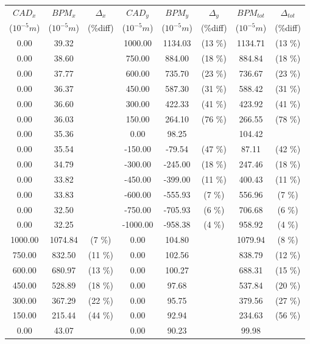 \begin{table}
\centering
\begin{tabular}{c c c c c c c c}
\toprule
\textbf{$CAD_{x}$} & \textbf{$BPM_{x}$ } & \textbf{$\Delta_{x}$} &\textbf{$CAD_{y}$} & \textbf{$BPM_{y}$} & \textbf{$\Delta_{y}$} & \textbf{$BPM_{tot}$} & \textbf{$\Delta_{tot}$} \\
($10^{-5} m$) & ($10^{-5} m$) & (\%diff) & ($10^{-5} m$) & ($10^{-5} m$) & (\%diff) & ($10^{-5} m$) & (\%diff) \\
\midrule
0.00 & 39.32 &  & 1000.00 & 1134.03 &  (13 \%) & 1134.71 &  (13 \%)\\
0.00 & 38.60 &  & 750.00 & 884.00 &  (18 \%) & 884.84 &  (18 \%)\\
0.00 & 37.77 &  & 600.00 & 735.70 &  (23 \%) & 736.67 &  (23 \%)\\
0.00 & 36.37 &  & 450.00 & 587.30 &  (31 \%) & 588.42 &  (31 \%)\\
0.00 & 36.60 &  & 300.00 & 422.33 &  (41 \%) & 423.92 &  (41 \%)\\
0.00 & 36.03 &  & 150.00 & 264.10 &  (76 \%) & 266.55 &  (78 \%)\\
0.00 & 35.36 &  & 0.00 & 98.25 &  & 104.42 & \\
0.00 & 35.54 &  & -150.00 & -79.54 &  (47 \%) & 87.11 &  (42 \%)\\
0.00 & 34.79 &  & -300.00 & -245.00 &  (18 \%) & 247.46 &  (18 \%)\\
0.00 & 33.82 &  & -450.00 & -399.00 &  (11 \%) & 400.43 &  (11 \%)\\
0.00 & 33.83 &  & -600.00 & -555.93 &  (7 \%) & 556.96 &  (7 \%)\\
0.00 & 32.50 &  & -750.00 & -705.93 &  (6 \%) & 706.68 &  (6 \%)\\
0.00 & 32.25 &  & -1000.00 & -958.38 &  (4 \%) & 958.92 &  (4 \%)\\
1000.00 & 1074.84 &  (7 \%) & 0.00 & 104.80 &  & 1079.94 &  (8 \%)\\
750.00 & 832.50 &  (11 \%) & 0.00 & 102.56 &  & 838.79 &  (12 \%)\\
600.00 & 680.97 &  (13 \%) & 0.00 & 100.27 &  & 688.31 &  (15 \%)\\
450.00 & 528.89 &  (18 \%) & 0.00 & 97.68 &  & 537.84 &  (20 \%)\\
300.00 & 367.29 &  (22 \%) & 0.00 & 95.75 &  & 379.56 &  (27 \%)\\
150.00 & 215.44 &  (44 \%) & 0.00 & 92.94 &  & 234.63 &  (56 \%)\\
0.00 & 43.07 &  & 0.00 & 90.23 &  & 99.98 & \\

\end{tabular}
\end{table}
